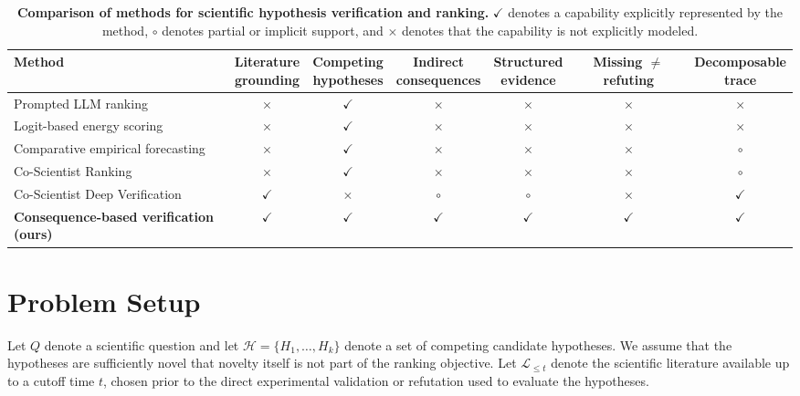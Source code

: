 \documentclass[twoside]{article}
\begin{document}
\begin{table}[h]
\centering
\caption{\textbf{Comparison of methods for scientific hypothesis verification
and ranking.} $\checkmark$ denotes a capability explicitly represented by the
method, $\circ$ denotes partial or implicit support, and $\times$ denotes that
the capability is not explicitly modeled.}
\scriptsize
\setlength{\tabcolsep}{5pt}
\vspace{0.5em}
\begin{tabular}{lcccccc}
\hline
\textbf{Method}
& \shortstack{Literature\\grounding}
& \shortstack{Competing\\hypotheses}
& \shortstack{Indirect\\consequences}
& \shortstack{Structured\\evidence}
& \shortstack{Missing\\$\mathbf{\neq}$refuting}
& \shortstack{Decomposable\\trace} \\
\hline
Prompted LLM ranking \cite{liu2026researchbench}
    & $\times$ & $\checkmark$ & $\times$ & $\times$ & $\times$ & $\times$ \\
Logit-based energy scoring \cite{rajwal2026logit}
    & $\times$ & $\checkmark$ & $\times$ & $\times$ & $\times$ & $\times$ \\
Comparative empirical forecasting \cite{mule2026forecasting}
    & $\times$ & $\checkmark$ & $\times$ & $\times$ & $\times$ & $\circ$ \\
Co-Scientist Ranking \cite{gottweis2026coscientist}
    & $\times$ & $\checkmark$ & $\times$ & $\times$ & $\times$ & $\circ$ \\
Co-Scientist Deep Verification \cite{gottweis2026coscientist}
    & $\checkmark$ & $\times$ & $\circ$ & $\circ$ & $\times$ & $\checkmark$ \\
\textbf{Consequence-based verification (ours)}
    & $\checkmark$ & $\checkmark$ & $\checkmark$ & $\checkmark$
    & $\checkmark$ & $\checkmark$ \\
\hline
\end{tabular}
\label{tab:related-work}
\end{table}

\section{Problem Setup}
\label{sec:problem}

Let $Q$ denote a scientific question and let
$\mathcal{H}=\{H_1,\ldots,H_k\}$ denote a set of competing candidate
hypotheses. We assume that the hypotheses are sufficiently novel that novelty
itself is not part of the ranking objective. Let $\mathcal{L}_{\leq t}$ denote
the scientific literature available up to a cutoff time $t$, chosen prior to
the direct experimental validation or refutation used to evaluate the
hypotheses.
\end{document}
